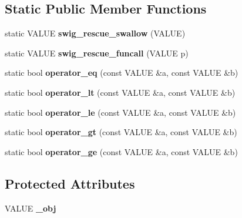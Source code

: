 \subsection*{Static Public Member Functions}
\begin{DoxyCompactItemize}
\item 
static V\+A\+L\+UE {\bfseries swig\+\_\+rescue\+\_\+swallow} (V\+A\+L\+UE)\hypertarget{classswig_1_1GC__VALUE_afd2f25641853026158c03f665f2d3d1b}{}\label{classswig_1_1GC__VALUE_afd2f25641853026158c03f665f2d3d1b}

\item 
static V\+A\+L\+UE {\bfseries swig\+\_\+rescue\+\_\+funcall} (V\+A\+L\+UE p)\hypertarget{classswig_1_1GC__VALUE_a48bc557f6904ae09a779b8358daea154}{}\label{classswig_1_1GC__VALUE_a48bc557f6904ae09a779b8358daea154}

\item 
static bool {\bfseries operator\+\_\+eq} (const V\+A\+L\+UE \&a, const V\+A\+L\+UE \&b)\hypertarget{classswig_1_1GC__VALUE_af67046f3a947b97b7f236fa86e8c87bb}{}\label{classswig_1_1GC__VALUE_af67046f3a947b97b7f236fa86e8c87bb}

\item 
static bool {\bfseries operator\+\_\+lt} (const V\+A\+L\+UE \&a, const V\+A\+L\+UE \&b)\hypertarget{classswig_1_1GC__VALUE_a2dbffb9ceef4627983ac16771c4da492}{}\label{classswig_1_1GC__VALUE_a2dbffb9ceef4627983ac16771c4da492}

\item 
static bool {\bfseries operator\+\_\+le} (const V\+A\+L\+UE \&a, const V\+A\+L\+UE \&b)\hypertarget{classswig_1_1GC__VALUE_a8b7937dc3319869a9bfea082e81c0f65}{}\label{classswig_1_1GC__VALUE_a8b7937dc3319869a9bfea082e81c0f65}

\item 
static bool {\bfseries operator\+\_\+gt} (const V\+A\+L\+UE \&a, const V\+A\+L\+UE \&b)\hypertarget{classswig_1_1GC__VALUE_a8f78b3e3fd1eca1e6a0f682bb4d571c5}{}\label{classswig_1_1GC__VALUE_a8f78b3e3fd1eca1e6a0f682bb4d571c5}

\item 
static bool {\bfseries operator\+\_\+ge} (const V\+A\+L\+UE \&a, const V\+A\+L\+UE \&b)\hypertarget{classswig_1_1GC__VALUE_a798916e97e6b29d166d6dea1c3896305}{}\label{classswig_1_1GC__VALUE_a798916e97e6b29d166d6dea1c3896305}

\end{DoxyCompactItemize}
\subsection*{Protected Attributes}
\begin{DoxyCompactItemize}
\item 
V\+A\+L\+UE {\bfseries \+\_\+obj}\hypertarget{classswig_1_1GC__VALUE_a1e6f6f3dddab69547b530f847e614034}{}\label{classswig_1_1GC__VALUE_a1e6f6f3dddab69547b530f847e614034}

\end{DoxyCompactItemize}
